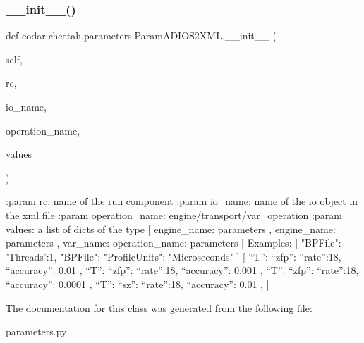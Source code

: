 \subsubsection{\texorpdfstring{\+\_\+\+\_\+init\+\_\+\+\_\+()}{\_\_init\_\_()}}
{\footnotesize\ttfamily def codar.\+cheetah.\+parameters.\+Param\+A\+D\+I\+O\+S2\+X\+M\+L.\+\_\+\+\_\+init\+\_\+\+\_\+ (\begin{DoxyParamCaption}\item[{}]{self,  }\item[{}]{rc,  }\item[{}]{io\+\_\+name,  }\item[{}]{operation\+\_\+name,  }\item[{}]{values }\end{DoxyParamCaption})}

\begin{DoxyVerb}:param rc: name of the run component
:param io_name: name of the io object in the xml file
:param operation_name: engine/transport/var_operation
:param values: a list of dicts of the type
[ { engine_name: {parameters} },
  { engine_name: {parameters} },
  { var_name: {operation_name: {parameters}}}
]
Examples:
[ {"BPFile": {'Threads':1}},
  {"BPFile": {"ProfileUnits": "Microseconds"}}
]
[ { “T”: { “zfp”: {“rate”:18, “accuracy”: 0.01} } },
  { “T”: { “zfp”: {“rate”:18, “accuracy”: 0.001} } },
  { “T”: { “zfp”: {“rate”:18, “accuracy”: 0.0001} } },
  { “T”: { “sz”:  {“rate”:18, “accuracy”: 0.01} } },
]
\end{DoxyVerb}
 

The documentation for this class was generated from the following file\+:\begin{DoxyCompactItemize}
\item 
parameters.\+py\end{DoxyCompactItemize}
